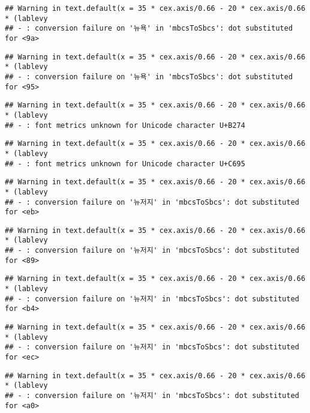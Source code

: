 \documentclass[
]{article}
\begin{document}
\begin{verbatim}
## Warning in text.default(x = 35 * cex.axis/0.66 - 20 * cex.axis/0.66 * (lablevy
## - : conversion failure on '뉴욕' in 'mbcsToSbcs': dot substituted for <9a>
\end{verbatim}

\begin{verbatim}
## Warning in text.default(x = 35 * cex.axis/0.66 - 20 * cex.axis/0.66 * (lablevy
## - : conversion failure on '뉴욕' in 'mbcsToSbcs': dot substituted for <95>
\end{verbatim}

\begin{verbatim}
## Warning in text.default(x = 35 * cex.axis/0.66 - 20 * cex.axis/0.66 * (lablevy
## - : font metrics unknown for Unicode character U+B274
\end{verbatim}

\begin{verbatim}
## Warning in text.default(x = 35 * cex.axis/0.66 - 20 * cex.axis/0.66 * (lablevy
## - : font metrics unknown for Unicode character U+C695
\end{verbatim}

\begin{verbatim}
## Warning in text.default(x = 35 * cex.axis/0.66 - 20 * cex.axis/0.66 * (lablevy
## - : conversion failure on '뉴저지' in 'mbcsToSbcs': dot substituted for <eb>
\end{verbatim}

\begin{verbatim}
## Warning in text.default(x = 35 * cex.axis/0.66 - 20 * cex.axis/0.66 * (lablevy
## - : conversion failure on '뉴저지' in 'mbcsToSbcs': dot substituted for <89>
\end{verbatim}

\begin{verbatim}
## Warning in text.default(x = 35 * cex.axis/0.66 - 20 * cex.axis/0.66 * (lablevy
## - : conversion failure on '뉴저지' in 'mbcsToSbcs': dot substituted for <b4>
\end{verbatim}

\begin{verbatim}
## Warning in text.default(x = 35 * cex.axis/0.66 - 20 * cex.axis/0.66 * (lablevy
## - : conversion failure on '뉴저지' in 'mbcsToSbcs': dot substituted for <ec>
\end{verbatim}

\begin{verbatim}
## Warning in text.default(x = 35 * cex.axis/0.66 - 20 * cex.axis/0.66 * (lablevy
## - : conversion failure on '뉴저지' in 'mbcsToSbcs': dot substituted for <a0>
\end{verbatim}
\end{document}
